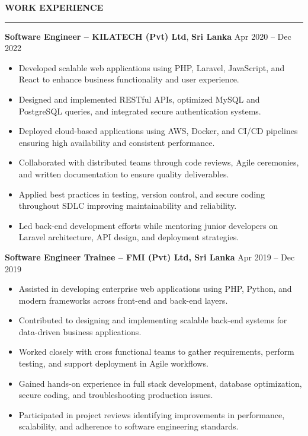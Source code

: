 \documentclass[10pt,letterpaper]{article}
\begin{document}
\textbf{WORK EXPERIENCE}\\[-8pt]
\noindent\rule{\textwidth}{1pt}

\vspace{-2pt}

\textbf{Software Engineer -- KILATECH (Pvt) Ltd}, \textbf{Sri Lanka} \hfill Apr 2020 -- Dec 2022

\vspace{-1pt}

\begin{itemize}
\item Developed scalable web applications using PHP, Laravel, JavaScript, and React to enhance business functionality and user experience.
\item Designed and implemented RESTful APIs, optimized MySQL and PostgreSQL queries, and integrated secure authentication systems.
\item Deployed cloud-based applications using AWS, Docker, and CI/CD pipelines ensuring high availability and consistent performance.
\item Collaborated with distributed teams through code reviews, Agile ceremonies, and written documentation to ensure quality deliverables.
\item Applied best practices in testing, version control, and secure coding throughout SDLC improving maintainability and reliability.
\item Led back-end development efforts while mentoring junior developers on Laravel architecture, API design, and deployment strategies.
\end{itemize}

\textbf{Software Engineer Trainee -- FMI (Pvt) Ltd, Sri Lanka} \hfill Apr 2019 -- Dec 2019

\vspace{-1pt}

\begin{itemize}
\item Assisted in developing enterprise web applications using PHP, Python, and modern frameworks across front-end and back-end layers.
\item Contributed to designing and implementing scalable back-end systems for data-driven business applications.
\item Worked closely with cross functional teams to gather requirements, perform testing, and support deployment in Agile workflows.
\item Gained hands-on experience in full stack development, database optimization, secure coding, and troubleshooting production issues.
\item Participated in project reviews identifying improvements in performance, scalability, and adherence to software engineering standards.
\end{itemize}
\end{document}
